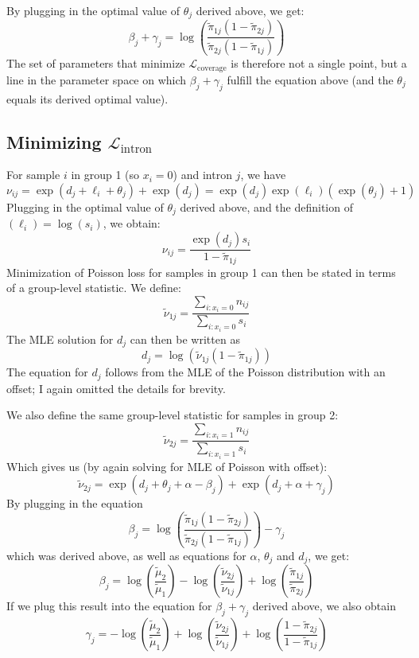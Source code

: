 \documentclass{article}
\begin{document}
	By plugging in the optimal value of $\theta_j$ derived above, we get:
	$$
	\beta_j + \gamma_j = \log \left( \frac{\tilde{\pi}_{1j} \left( 1-\tilde{\pi}_{2j}\right)}{\tilde{\pi}_{2j} \left( 1-\tilde{\pi}_{1j}\right)}\right)
	$$
	The set of parameters that minimize $\mathcal{L}_{\text{coverage}}$ is therefore not a single point, but a line in the parameter space on which $\beta_j+\gamma_j$ fulfill the equation above (and the $\theta_j$ equals its derived optimal value).
	\subsection{Minimizing $\mathcal{L}_{\text{intron}}$}
	For sample $i$ in group 1 (so $x_i=0$) and intron $j$, we have
	$$
	\nu_{ij} = \exp(d_j + \ell_i + \theta_j) + \exp(d_j) = \exp(d_j) \exp(\ell_i) \left( \exp(\theta_j)+1 \right)
	$$
	Plugging in the optimal value of $\theta_j$ derived above, and the definition of  $(\ell_i)=\log(s_i)$, we obtain:
	$$
	\nu_{ij} = \frac{\exp(d_j) s_i}{1-\tilde{\pi}_{1j}}
	$$
	Minimization of Poisson loss for samples in group 1 can then be stated in terms of a group-level statistic. We define:
	$$
	\tilde{\nu}_{1j} = \frac{\sum_{i: x_i=0} n_{ij}}{\sum_{i: x_i=0} s_i}  
	$$
	The MLE solution for $d_j$ can then be written as
	$$
	d_j = \log \left( \tilde{\nu}_{1j} \left( 1 - \tilde{\pi}_{1j} \right) \right)
	$$
	The equation for $d_j$ follows from the MLE of the Poisson distribution with an offset; I again omitted the details for brevity.
	
	We also define the same group-level statistic for samples in group 2:
	$$
	\tilde{\nu}_{2j} = \frac{\sum_{i: x_i=1} n_{ij}}{\sum_{i: x_i=1} s_i}  
	$$
	Which gives us (by again solving for MLE of Poisson with offset):
	$$
	\tilde{\nu}_{2j} = \exp(d_j + \theta_j +\alpha -\beta_j) + \exp(d_j+\alpha+\gamma_j) 
	$$
	By plugging in the equation
	$$
	\beta_j = \log \left( \frac{\tilde{\pi}_{1j} \left( 1-\tilde{\pi}_{2j}\right)}{\tilde{\pi}_{2j} \left( 1-\tilde{\pi}_{1j}\right)}\right) - \gamma_j
	$$
	which was derived above, as well as equations for $\alpha$, $\theta_j$ and $d_j$, we get:
	$$
	\beta_j = \log \left(\frac{\tilde{\mu}_2}{\tilde{\mu}_1}\right) - \log \left(\frac{\tilde{\nu}_{2j}}{\tilde{\nu}_{1j}}\right) + \log \left(\frac{\tilde{\pi}_{1j}}{\tilde{\pi}_{2j}}\right)
	$$
	If we plug this result into the equation for $\beta_j+\gamma_j$ derived above, we also obtain
	$$
	\gamma_j = -\log \left(\frac{\tilde{\mu}_2}{\tilde{\mu}_1}\right) + \log \left(\frac{\tilde{\nu}_{2j}}{\tilde{\nu}_{1j}}\right) + \log \left(\frac{1-\tilde{\pi}_{2j}}{1-\tilde{\pi}_{1j}}\right)
	$$
\end{document}
